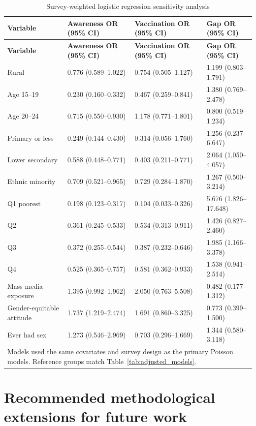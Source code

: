 \begin{longtable}{|p{3.8cm}|p{3.0cm}|p{3.0cm}|p{3.0cm}|}
\caption{Survey-weighted logistic regression sensitivity analysis}
\label{tab:logistic_sensitivity}\\
\hline
\textbf{Variable} & \textbf{Awareness OR (95\% CI)} & \textbf{Vaccination OR (95\% CI)} & \textbf{Gap OR (95\% CI)} \\
\hline
\endfirsthead
\hline
\textbf{Variable} & \textbf{Awareness OR (95\% CI)} & \textbf{Vaccination OR (95\% CI)} & \textbf{Gap OR (95\% CI)} \\
\hline
\endhead
Rural & 0.776 (0.589--1.022) & 0.754 (0.505--1.127) & 1.199 (0.803--1.791) \\
Age 15--19 & 0.230 (0.160--0.332) & 0.467 (0.259--0.841) & 1.380 (0.769--2.478) \\
Age 20--24 & 0.715 (0.550--0.930) & 1.178 (0.771--1.801) & 0.800 (0.519--1.234) \\
Primary or less & 0.249 (0.144--0.430) & 0.314 (0.056--1.760) & 1.256 (0.237--6.647) \\
Lower secondary & 0.588 (0.448--0.771) & 0.403 (0.211--0.771) & 2.064 (1.050--4.057) \\
Ethnic minority & 0.709 (0.521--0.965) & 0.729 (0.284--1.870) & 1.267 (0.500--3.214) \\
Q1 poorest & 0.198 (0.123--0.317) & 0.104 (0.033--0.326) & 5.676 (1.826--17.648) \\
Q2 & 0.361 (0.245--0.533) & 0.534 (0.313--0.911) & 1.426 (0.827--2.460) \\
Q3 & 0.372 (0.255--0.544) & 0.387 (0.232--0.646) & 1.985 (1.166--3.378) \\
Q4 & 0.525 (0.365--0.757) & 0.581 (0.362--0.933) & 1.538 (0.941--2.514) \\
Mass media exposure & 1.395 (0.992--1.962) & 2.050 (0.763--5.508) & 0.482 (0.177--1.312) \\
Gender-equitable attitude & 1.737 (1.219--2.474) & 1.691 (0.860--3.325) & 0.773 (0.399--1.500) \\
Ever had sex & 1.273 (0.546--2.969) & 0.703 (0.296--1.669) & 1.344 (0.580--3.118) \\
\hline
\multicolumn{4}{|p{13.0cm}|}{\footnotesize Models used the same covariates and survey design as the primary Poisson models. Reference groups match Table~\ref{tab:adjusted_models}.} \\
\hline
\end{longtable}


\section{Recommended methodological extensions for future work}

